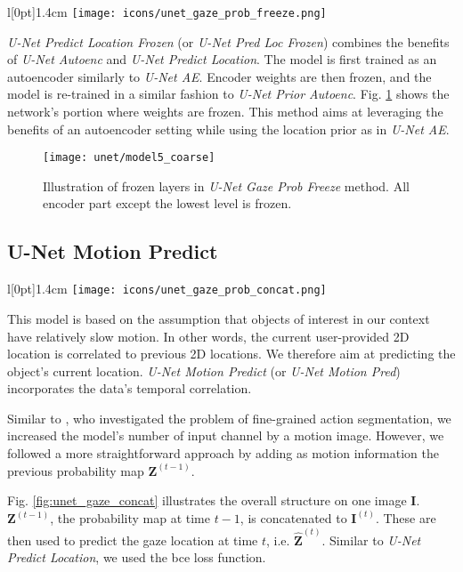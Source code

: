 \setlength\intextsep{0pt}
\begin{wrapfigure}[4]{l}[0pt]{1.4cm}
\texttt{[image: icons/unet\_gaze\_prob\_freeze.png]}
\end{wrapfigure}

\textit{U-Net Predict Location Frozen} (or \textit{U-Net Pred Loc Frozen}) combines the benefits of \textit{U-Net Autoenc} and \textit{U-Net Predict Location}.
The model is first trained as an autoencoder similarly to \textit{U-Net AE}.
Encoder weights are then frozen, and the model is re-trained in a similar fashion to \textit{U-Net Prior Autoenc}.
Fig. \ref{fig:model_freeze} shows the network's portion where weights are frozen.
This method aims at leveraging the benefits of an autoencoder setting while using the location prior as in \textit{U-Net AE}.

\begin{figure}[htbp]
  \centering
  \texttt{[image: unet/model5\_coarse]}
  \caption[Modified U-Net with freezed encoder part]{Illustration of frozen layers in \textit{U-Net Gaze Prob Freeze} method. All encoder part except the lowest level is frozen.}
  \label{fig:model_freeze}
\end{figure}

\subsection{U-Net Motion Predict} \label{sec:unet_pred_loc_concat}
\begingroup
\setlength\intextsep{0pt}
\begin{wrapfigure}[4]{l}[0pt]{1.4cm}
\texttt{[image: icons/unet\_gaze\_prob\_concat.png]}
\end{wrapfigure}

This model is based on the assumption that objects of interest in our context have relatively slow motion.
In other words, the current user-provided 2D location is correlated to previous 2D locations.
We therefore aim at predicting the object's current location.
\textit{U-Net Motion Predict} (or \textit{U-Net Motion Pred}) incorporates the data's temporal correlation.

Similar to \cite{lea16}, who investigated the problem of fine-grained action segmentation, we increased the model's number of input channel by a motion image.
However, we followed a more straightforward approach by adding as motion information the previous probability map $\boldsymbol{Z}^{(t-1)}$.

Fig. \ref{fig:unet_gaze_concat} illustrates the overall structure on one image $\boldsymbol{I}$.
$\boldsymbol{Z}^{(t-1)}$, the probability map at time $t-1$, is concatenated to $\boldsymbol{I}^{(t)}$.
These are then used to predict the gaze location at time $t$, i.e. $\boldsymbol{\hat{Z}}^{(t)}$.
Similar to \textit{U-Net Predict Location}, we used the \gls{bce} loss function.

